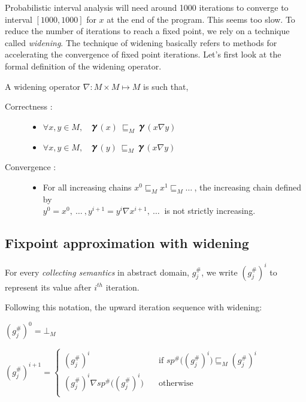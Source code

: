 \documentclass[final,3p, review, times]{Elsevier/elsarticle}
\newcommand{\GAMMA}{\large\boldsymbol{\gamma}\normalsize}
\begin{document}
\noindent Probabilistic interval analysis will need around 1000 iterations to converge to interval $[1000, 1000]$ for $x$ at the end of the program.
This seems too slow. To reduce the number of iterations to reach a fixed point, we rely on a technique called \textit{widening}. The technique of widening basically refers to methods for accelerating the convergence of fixed point iterations. Let's first look at the formal definition of the widening operator.

\noindent A widening operator $\nabla: M\times M\mapsto M$ is such that,

\begin{description}
  \item[Correctness :] \hfill
  \begin{itemize}
    \item $\forall x,y\in M,\quad$$\GAMMA$$(x)\ \sqsubseteq_M\ $$\GAMMA$$(x\nabla y)$
    \item $\forall x,y\in M,\quad$$\GAMMA$$(y)\ \sqsubseteq_M\ $$\GAMMA$$(x\nabla y)$
  \end{itemize}
  \item[Convergence :] \hfill
  \begin{itemize}
    \item For all increasing chains $x^0\sqsubseteq_M x^1\sqsubseteq_M\ldots\ $, the increasing chain defined by\\
    $y^0=x^0,\ \ldots\ ,y^{i+1}=y^i\nabla x^{i+1},\ \ldots\ $ is not strictly increasing.
  \end{itemize}
\end{description}

\subsection{Fixpoint approximation with widening}

For every \textit{collecting semantics} in abstract domain, $g^\#_j$, we write $(g^\#_j)^i$ to represent its value after $i^{th}$ iteration.

Following this notation, the upward iteration sequence with widening\cite{cousot05}:

$(g^\#_j)^0=\bot_M$

$(g^\#_j)^{i+1} =
  \begin{cases}
    (g^\#_j)^i       & \quad \text{if } sp^\#\Big((g^\#_j)^i\Big)\sqsubseteq_M (g^\#_j)^i\\
    (g^\#_j)^i\nabla sp^\#\Big((g^\#_j)^i\Big)  & \quad \text{otherwise}\\
  \end{cases}
$\\
\end{document}
